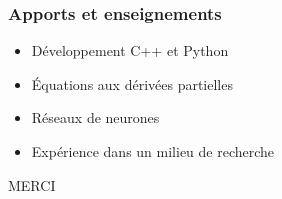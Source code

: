 \begin{frame}
    \frametitle{Apports et enseignements}
    \begin{itemize}[<+>]
        \item Développement C++ et Python   %
        \item Équations aux dérivées partielles %
        \item Réseaux de neurones %
        \item Expérience dans un milieu de recherche %
    \end{itemize}
\end{frame}

\begin{frame}
    \LARGE
    \centering
    MERCI
\end{frame}

% 

